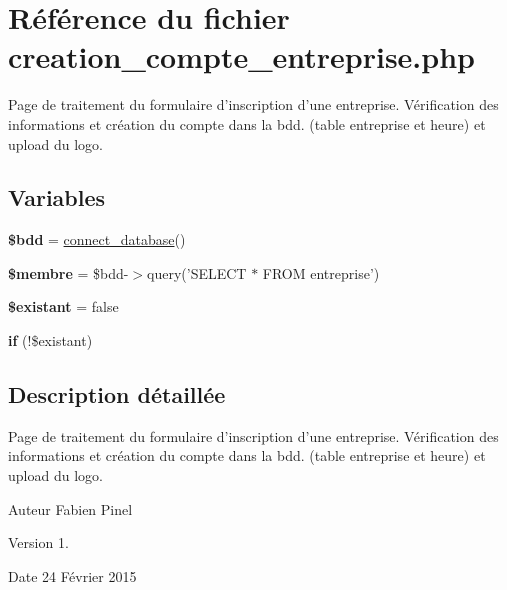 \hypertarget{creation__compte__entreprise_8php}{\section{Référence du fichier creation\-\_\-compte\-\_\-entreprise.\-php}
\label{creation__compte__entreprise_8php}
}


Page de traitement du formulaire d'inscription d'une entreprise. Vérification des informations et création du compte dans la bdd. (table entreprise et heure) et upload du logo.  


\subsection*{Variables}
\begin{DoxyCompactItemize}
\item 
\hypertarget{creation__compte__entreprise_8php_a94f91e878bce0991e2cd595c5dd79b3f}{{\bfseries \$bdd} = \hyperlink{function_8php_a1f56f7efe8c1222675d8715c259957d5}{connect\-\_\-database}()}\label{creation__compte__entreprise_8php_a94f91e878bce0991e2cd595c5dd79b3f}

\item 
\hypertarget{creation__compte__entreprise_8php_aa000a46a528298c316b1fdf788402a63}{{\bfseries \$membre} = \$bdd-\/$>$query('S\-E\-L\-E\-C\-T $\ast$ F\-R\-O\-M entreprise')}\label{creation__compte__entreprise_8php_aa000a46a528298c316b1fdf788402a63}

\item 
\hypertarget{creation__compte__entreprise_8php_a3289caad8efe0a8b4dffdfc5d252d16f}{{\bfseries \$existant} = false}\label{creation__compte__entreprise_8php_a3289caad8efe0a8b4dffdfc5d252d16f}

\item 
{\bfseries if} (!\$existant)
\end{DoxyCompactItemize}


\subsection{Description détaillée}
Page de traitement du formulaire d'inscription d'une entreprise. Vérification des informations et création du compte dans la bdd. (table entreprise et heure) et upload du logo. \begin{DoxyAuthor}{Auteur}
Fabien Pinel 
\end{DoxyAuthor}
\begin{DoxyVersion}{Version}
1. 
\end{DoxyVersion}
\begin{DoxyDate}{Date}
24 Février 2015 
\end{DoxyDate}


